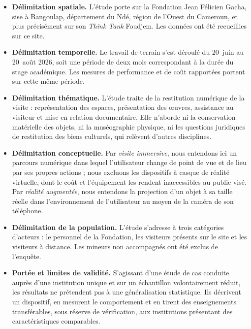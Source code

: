 \begin{itemize}
  \item \textbf{Délimitation spatiale.} L'étude porte sur la Fondation Jean
        Félicien Gacha, sise à Bangoulap, département du Ndé, région de l'Ouest
        du Cameroun, et plus précisément sur son \emph{Think Tank} Foudjem.
        Les données ont été recueillies sur ce site.

  \item \textbf{Délimitation temporelle.} Le travail de terrain s'est déroulé du
        20~juin au 20~août 2026, soit une période de deux mois correspondant à
        la durée du stage académique. Les mesures de performance et de coût
        rapportées portent sur cette même période.

  \item \textbf{Délimitation thématique.} L'étude traite de la restitution
        numérique de la visite : représentation des espaces, présentation des
        œuvres, assistance au visiteur et mise en relation documentaire. Elle
        n'aborde ni la conservation matérielle des objets, ni la muséographie
        physique, ni les questions juridiques de restitution des biens
        culturels, qui relèvent d'autres disciplines.

  \item \textbf{Délimitation conceptuelle.} Par \emph{visite immersive}, nous
        entendons ici un parcours numérique dans lequel l'utilisateur change de
        point de vue et de lieu par ses propres actions ; nous excluons les
        dispositifs à casque de réalité virtuelle, dont le coût et l'équipement
        les rendent inaccessibles au public visé. Par \emph{réalité augmentée},
        nous entendons la projection d'un objet à sa taille réelle dans
        l'environnement de l'utilisateur au moyen de la caméra de son téléphone.

  \item \textbf{Délimitation de la population.} L'étude s'adresse à trois
        catégories d'acteurs : le personnel de la Fondation, les visiteurs
        présents sur le site et les visiteurs à distance. Les mineurs non
        accompagnés ont été exclus de l'enquête.

  \item \textbf{Portée et limites de validité.} S'agissant d'une étude de cas
        conduite auprès d'une institution unique et sur un échantillon
        volontairement réduit, les résultats ne prétendent pas à une
        généralisation statistique. Ils décrivent un dispositif, en mesurent le
        comportement et en tirent des enseignements transférables, sous réserve
        de vérification, aux institutions présentant des caractéristiques
        comparables.
\end{itemize}

